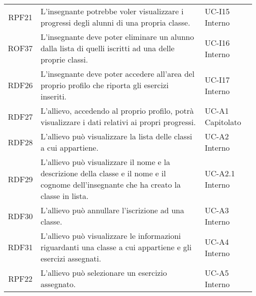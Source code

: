 \begin{tabularx}{\textwidth}{| c | p{10cm} | X |}
		RPF21 & L'insegnante potrebbe voler visualizzare i progressi degli alunni di una propria classe. & UC-I15 \newline Interno\\
		ROF37 & L'insegnante deve poter eliminare un alunno dalla lista di quelli iscritti ad una delle proprie classi. & UC-I16 \newline Interno\\
		RDF26 & L'insegnante deve poter accedere all'area del proprio profilo che riporta gli esercizi inseriti. & UC-I17 \newline Interno\\

		RDF27 & L'allievo, accedendo al proprio profilo, potrà visualizzare i dati relativi ai propri progressi. & UC-A1 \newline Capitolato\\		
		RDF28 & L'allievo può visualizzare la lista delle classi a cui appartiene. & UC-A2 \newline Interno\\
		RDF29 & L'allievo può visualizzare il nome e la descrizione della classe e il nome e il cognome dell'insegnante che ha creato la classe in lista. & UC-A2.1 \newline Interno\\
		RDF30 & L'allievo può annullare l'iscrizione ad una classe. & UC-A3 \newline Interno\\
		RDF31 & L'allievo può visualizzare le informazioni riguardanti una classe a cui appartiene e gli esercizi assegnati. & UC-A4 \newline Interno\\
		RPF22 & L'allievo può selezionare un esercizio assegnato. & UC-A5 \newline Interno\\


\end{tabularx}
